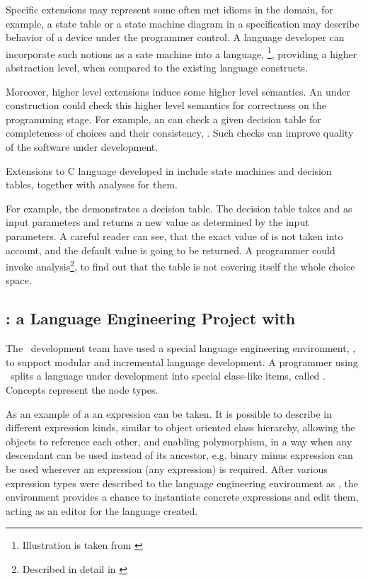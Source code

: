 Specific extensions may represent some often met idioms in the domain, for example, 
a state table or  a state machine diagram in a specification may describe behavior of a device under the 
programmer control. A language developer can incorporate such notions as a sate machine into a language, \footnote{Illustration is taken from \cite{2012_ratiu_modular_dsls_and_analyses} }, 
providing a higher abstraction level, when compared to the existing language constructs. 


Moreover, higher level extensions induce some higher level semantics. An  under construction could check 
this higher level semantics for correctness on the programming stage. For example, an  can check a given decision table 
for completeness of choices and their consistency, \cite{2012_ratiu_modular_dsls_and_analyses}. Such checks can improve 
quality of the software under development. 

Extensions to C language developed in  include state machines and decision tables, together with analyses
for them.

For example, the  demonstrates a decision table. The decision table takes  and  as input parameters
and returns a new  value as determined by the input parameters. A careful reader can see, that the exact value  of 
is not taken into account, and the default value  is going to be returned. A programmer could invoke analysis\footnote{Described in detail 
in  \cite{2012_ratiu_modular_dsls_and_analyses}}, to find out that the table is not covering itself the whole choice space.

\subsection{\mbdr: a Language Engineering Project with \jbmps}

The \mbdr\ development team have used a special language engineering environment, , to support modular and incremental 
language development.  A programmer using \jbmps\ splits a language under development into special class-like items, 
called . Concepts represent the  node types. 

As an example of a  an expression can be taken. It is possible to describe in  different 
expression kinds, similar to object oriented class hierarchy, allowing the objects to reference each other, 
and enabling polymorphism, in a way when any descendant can be used instead of its ancestor, e.g. 
binary minus expression can be used wherever an expression (any expression) is required. 
After various expression types were described to the language engineering environment as , 
the environment provides a chance to instantiate concrete expressions and edit them, acting as an editor for 
the language created.

